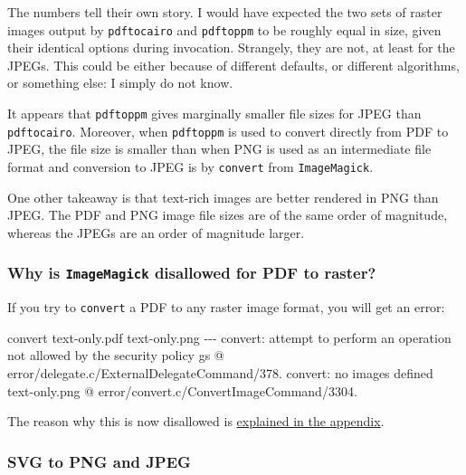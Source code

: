 \documentclass[
  11pt,
  british,
  a4paper,
]{article}
\newenvironment{Shaded}{\begin{snugshade}}{\end{snugshade}}
\newcommand{\ExtensionTok}[1]{\textcolor[rgb]{0.80,0.80,0.80}{#1}}
\newcommand{\NormalTok}[1]{\textcolor[rgb]{0.80,0.80,0.80}{#1}}
\newcommand{\StringTok}[1]{\textcolor[rgb]{0.80,0.58,0.58}{#1}}
\begin{document}
The numbers tell their own story. I would have expected the two sets of
raster images output by \texttt{pdftocairo} and \texttt{pdftoppm} to be
roughly equal in size, given their identical options during invocation.
Strangely, they are not, at least for the JPEGs. This could be either
because of different defaults, or different algorithms, or something
else: I simply do not know.

It appears that \texttt{pdftoppm} gives marginally smaller file sizes
for JPEG than \texttt{pdftocairo}. Moreover, when \texttt{pdftoppm} is
used to convert directly from PDF to JPEG, the file size is smaller than
when PNG is used as an intermediate file format and conversion to JPEG
is by \texttt{convert} from \texttt{ImageMagick}.

One other takeaway is that text-rich images are better rendered in PNG
than JPEG. The PDF and PNG image file sizes are of the same order of
magnitude, whereas the JPEGs are an order of magnitude larger.

\hypertarget{why-is-imagemagick-disallowed-for-pdf-to-raster}{%
\subsubsection{\texorpdfstring{Why is \texttt{ImageMagick} disallowed
for PDF to
raster?}{Why is ImageMagick disallowed for PDF to raster?}}\label{why-is-imagemagick-disallowed-for-pdf-to-raster}}

If you try to \texttt{convert} a PDF to any raster image format, you
will get an error:

\begin{Shaded}
\begin{Highlighting}[]
\ExtensionTok{convert}\NormalTok{ text{-}only.pdf text{-}only.png}
\ExtensionTok{{-}{-}{-}}
\ExtensionTok{convert:}\NormalTok{ attempt to perform an operation not allowed by the security policy }\StringTok{\textquotesingle{}gs\textquotesingle{}}\NormalTok{ @ error/delegate.c/ExternalDelegateCommand/378.}
\ExtensionTok{convert:}\NormalTok{ no images defined }\StringTok{\textquotesingle{}text{-}only.png\textquotesingle{}}\NormalTok{ @ error/convert.c/ConvertImageCommand/3304.}
\end{Highlighting}
\end{Shaded}

The reason why this is now disallowed is
\protect\hyperlink{appendix-security-vulnerabilities-in-imagemagick}{explained
in the appendix}.

\hypertarget{svg-to-png-and-jpeg}{%
\subsubsection{SVG to PNG and JPEG}\label{svg-to-png-and-jpeg}}
\end{document}
